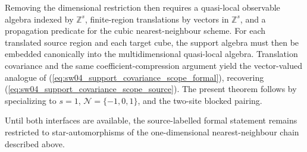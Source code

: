 \documentclass{article}
\begin{document}
Removing the dimensional restriction then requires a quasi-local observable
algebra indexed by $\mathbb Z^s$, finite-region translations by vectors in
$\mathbb Z^s$, and a propagation predicate for the cubic nearest-neighbour
scheme. For each translated source region and each target cube, the support algebra
must then be embedded canonically into the multidimensional quasi-local
algebra. Translation covariance and the same coefficient-compression
argument yield the vector-valued analogue of
(\ref{eq:sw04_support_covariance_scope_formal}), recovering
(\ref{eq:sw04_support_covariance_scope_source}). The present
theorem follows by specializing to $s=1$, $\mathcal N=\{-1,0,1\}$, and the
two-site blocked pairing.

Until both interfaces are available, the source-labelled formal statement
remains restricted to star-automorphisms of the one-dimensional
nearest-neighbour chain described above.



\end{document}
